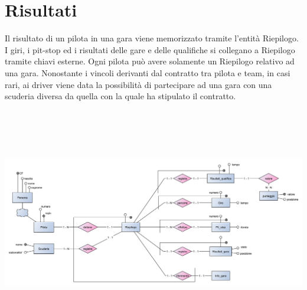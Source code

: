 \documentclass[a4paper,12pt]{report}
\begin{document}
		\section{Risultati}
	{\fontsize{12.5}{20}\selectfont
	Il risultato di un pilota in una gara viene memorizzato tramite l'entità Riepilogo.
	I giri, i pit-stop ed i risultati delle gare e delle qualifiche si collegano a Riepilogo tramite chiavi esterne.
	Ogni pilota può avere solamente un Riepilogo relativo ad una gara.
	Nonostante i vincoli derivanti dal contratto tra pilota e team, in casi rari, ai driver viene data la possibilità
	di partecipare ad una gara con una scuderia diversa da quella con la quale ha stipulato il contratto.}
	\newline
	\begin{center}
		\hspace*{-3cm}%
		\includegraphics[width=\dimexpr\textwidth+6cm\relax, height=10cm]{copies/scheletro3.pdf}%
		\hspace*{-3cm}%
	\end{center}
	\pagebreak
\end{document}
